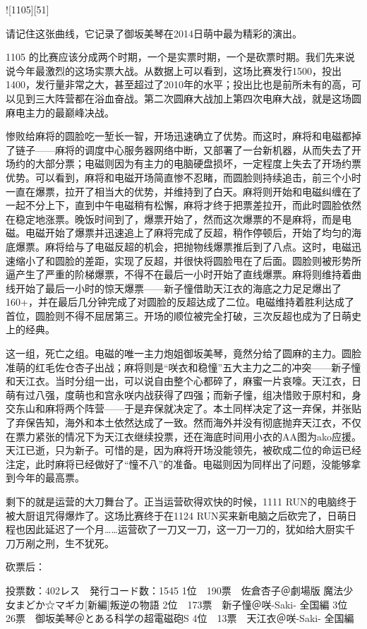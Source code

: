 ![1105][51]

请记住这张曲线，它记录了御坂美琴在2014日萌中最为精彩的演出。

1105 的比赛应该分成两个时期，一个是实票时期，一个是砍票时期。我们先来说说今年最激烈的这场实票大战。从数据上可以看到，这场比赛发行1500，投出1400，发行量非常之大，甚至超过了2010年的水平；投出比也是前所未有的高，可以见到三大阵营都在浴血奋战。第二次圆麻大战加上第四次电麻大战，就是这场圆麻电主力的最巅峰决战。

惨败给麻将的圆脸吃一堑长一智，开场迅速确立了优势。而这时，麻将和电磁都掉了链子——麻将的调度中心服务器网络中断，又部署了一台新机器，从而失去了开场约的大部分票；电磁则因为有主力的电脑硬盘损坏，一定程度上失去了开场约票优势。可以看到，麻将和电磁开场简直惨不忍睹，而圆脸则持续追击，前三个小时一直在爆票，拉开了相当大的优势，并维持到了白天。麻将则开始和电磁纠缠在了一起不分上下，直到中午电磁稍有松懈，麻将才终于把票差拉开，而此时圆脸依然在稳定地涨票。晚饭时间到了，爆票开始了，然而这次爆票的不是麻将，而是电磁。电磁开始了爆票并迅速追上了麻将完成了反超，稍作停顿后，开始了均匀的海底爆票。麻将给与了电磁反超的机会，把抛物线爆票推后到了八点。这时，电磁迅速缩小了和圆脸的差距，实现了反超，并很快将圆脸甩在了后面。圆脸则被形势所逼产生了严重的阶梯爆票，不得不在最后一小时开始了直线爆票。麻将则维持着曲线开始了最后一小时的惊天爆票——新子憧借助天江衣的海底之力足足爆出了160+，并在最后几分钟完成了对圆脸的反超达成了二位。电磁维持着胜利达成了首位，圆脸则不得不屈居第三。开场的顺位被完全打破，三次反超也成为了日萌史上的经典。

这一组，死亡之组。电磁的唯一主力炮姐御坂美琴，竟然分给了圆麻的主力。圆脸准萌的红毛佐仓杏子出战；麻将则是“咲衣和稳憧”五大主力之二的冲突——新子憧和天江衣。当时分组一出，可以说自由整个心都碎了，麻蜜一片哀嚎。天江衣，日萌有过八强，度萌也和宫永咲内战获得了四强；而新子憧，组决惜败于原村和，身交东山和麻将两个阵营——于是弃保就决定了。本土同样决定了这一弃保，并张贴了弃保告知，海外和本土依然达成了一致。然而海外并没有彻底抛弃天江衣，不仅在票力紧张的情况下为天江衣继续投票，还在海底时间用小衣的AA图为ako应援。天江已逝，只为新子。可惜的是，因为麻将开场没能领先，被砍成二位的命运已经注定，此时麻将已经做好了“憧不八”的准备。电磁则因为同样出了问题，没能够拿到今年的最高票。

剩下的就是运营的大刀舞台了。正当运营砍得欢快的时候，1111 RUN的电脑终于被大厨诅咒得爆炸了。这场比赛终于在1124 RUN买来新电脑之后砍完了，日萌日程也因此延迟了一个月……运营砍了一刀又一刀，这一刀一刀的，犹如给大厨实千刀万剐之刑，生不犹死。

砍票后：

	投票数：402レス　発行コード数：1545
	1位　190票　佐倉杏子＠劇場版 魔法少女まどか☆マギカ[新編]叛逆の物語
	2位　173票　新子憧＠咲-Saki- 全国編
	3位　26票　御坂美琴＠とある科学の超電磁砲S
	4位　13票　天江衣＠咲-Saki- 全国編

